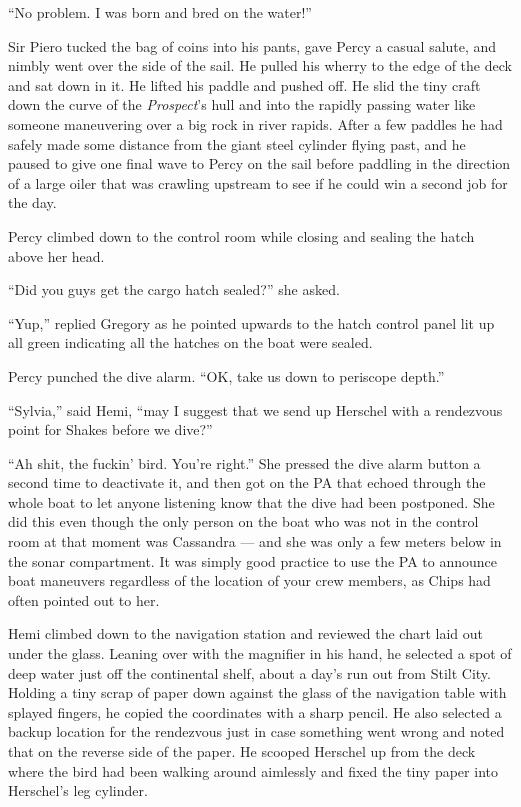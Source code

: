 \documentclass[
]{scrbook}
\begin{document}
``No problem. I was born and bred on the water!''

Sir Piero tucked the bag of coins into his pants, gave Percy a casual
salute, and nimbly went over the side of the sail. He pulled his wherry
to the edge of the deck and sat down in it. He lifted his paddle and
pushed off. He slid the tiny craft down the curve of the
\emph{Prospect}'s hull and into the rapidly passing water like someone
maneuvering over a big rock in river rapids. After a few paddles he had
safely made some distance from the giant steel cylinder flying past, and
he paused to give one final wave to Percy on the sail before paddling in
the direction of a large oiler that was crawling upstream to see if he
could win a second job for the day.

\bigskip

Percy climbed down to the control room while closing and sealing the
hatch above her head.

``Did you guys get the cargo hatch sealed?'' she asked.

``Yup,'' replied Gregory as he pointed upwards to the hatch control
panel lit up all green indicating all the hatches on the boat were
sealed.

Percy punched the dive alarm. ``OK, take us down to periscope depth.''

``Sylvia,'' said Hemi, ``may I suggest that we send up Herschel with a
rendezvous point for Shakes before we dive?''

``Ah shit, the fuckin' bird. You're right.'' She pressed the dive alarm
button a second time to deactivate it, and then got on the PA that
echoed through the whole boat to let anyone listening know that the dive
had been postponed. She did this even though the only person on the boat
who was not in the control room at that moment was Cassandra --- and she
was only a few meters below in the sonar compartment. It was simply good
practice to use the PA to announce boat maneuvers regardless of the
location of your crew members, as Chips had often pointed out to her.

Hemi climbed down to the navigation station and reviewed the chart laid
out under the glass. Leaning over with the magnifier in his hand, he
selected a spot of deep water just off the continental shelf, about a
day's run out from Stilt City. Holding a tiny scrap of paper down
against the glass of the navigation table with splayed fingers, he
copied the coordinates with a sharp pencil. He also selected a backup
location for the rendezvous just in case something went wrong and noted
that on the reverse side of the paper. He scooped Herschel up from the
deck where the bird had been walking around aimlessly and fixed the tiny
paper into Herschel's leg cylinder.
\end{document}
